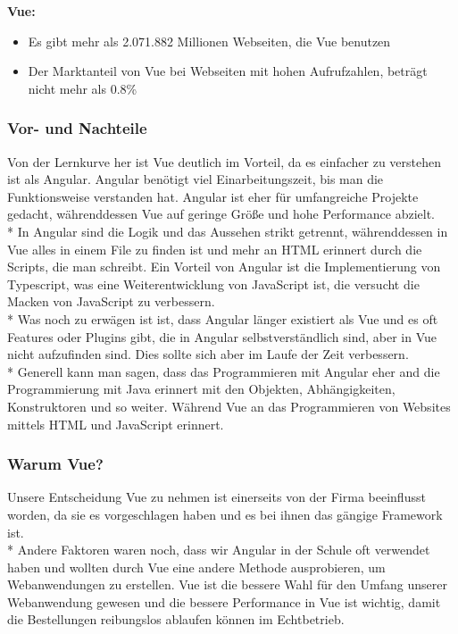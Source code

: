\textbf{Vue:}
\begin{itemize}
    \item Es gibt mehr als 2.071.882 Millionen Webseiten, die Vue benutzen
    \item Der Marktanteil von Vue bei Webseiten mit hohen Aufrufzahlen, beträgt nicht mehr als 0.8\% \cite{AngVsVueSIM}       
\end{itemize}
\subsubsection{Vor- und Nachteile}
Von der Lernkurve her ist Vue deutlich im Vorteil, da es einfacher zu verstehen ist als Angular. Angular benötigt viel Einarbeitungszeit, bis man die Funktionsweise
verstanden hat. Angular ist eher für umfangreiche Projekte gedacht, währenddessen Vue auf geringe Größe und hohe Performance abzielt. \\*
In Angular sind die Logik und das Aussehen strikt getrennt, währenddessen in Vue alles in einem File zu finden ist und mehr an HTML erinnert durch die Scripts, die man schreibt.
Ein Vorteil von Angular ist die Implementierung von Typescript, was eine Weiterentwicklung von JavaScript ist, die versucht die Macken von JavaScript zu verbessern.\\* 
Was noch zu erwägen ist ist, dass Angular länger existiert als Vue und es oft Features oder Plugins gibt, die in Angular selbstverständlich sind, aber in Vue nicht aufzufinden sind.
Dies sollte sich aber im Laufe der Zeit verbessern. \\*  Generell kann man sagen, dass das Programmieren mit Angular eher and die Programmierung mit Java erinnert mit den Objekten, Abhängigkeiten,
Konstruktoren und so weiter. Während Vue an das Programmieren von Websites mittels HTML und JavaScript erinnert. \cite{AngVsVueHOST}
\subsubsection{Warum Vue?}
Unsere Entscheidung Vue zu nehmen ist einerseits von der Firma beeinflusst worden, da sie es vorgeschlagen haben und es bei ihnen das gängige Framework ist.\\*
Andere Faktoren waren noch, dass wir Angular in der Schule oft verwendet haben und wollten durch Vue eine andere Methode ausprobieren, um Webanwendungen zu erstellen.
Vue ist die bessere Wahl für den Umfang unserer Webanwendung gewesen und die bessere Performance in Vue ist wichtig, damit die Bestellungen reibungslos ablaufen können im Echtbetrieb.

